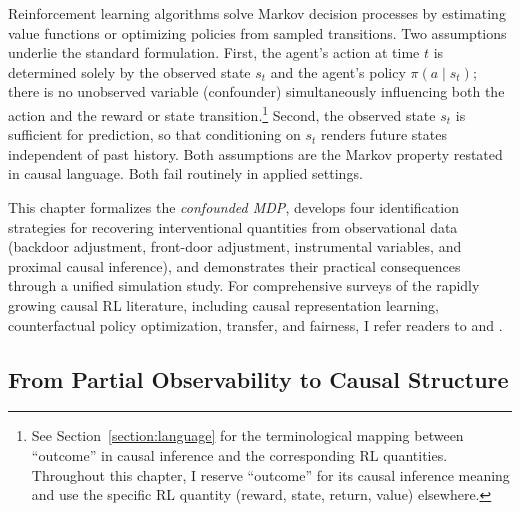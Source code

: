 %

Reinforcement learning algorithms solve Markov decision processes by estimating value functions or optimizing policies from sampled transitions. Two assumptions underlie the standard formulation. First, the agent's action at time $t$ is determined solely by the observed state $s_t$ and the agent's policy $\pi(a \mid s_t)$; there is no unobserved variable (confounder) simultaneously influencing both the action and the reward or state transition.\footnote{See Section~\ref{section:language} for the terminological mapping between ``outcome'' in causal inference and the corresponding RL quantities. Throughout this chapter, I reserve ``outcome'' for its causal inference meaning and use the specific RL quantity (reward, state, return, value) elsewhere.}
Second, the observed state $s_t$ is sufficient for prediction, so that conditioning on $s_t$ renders future states independent of past history. Both assumptions are the Markov property restated in causal language. Both fail routinely in applied settings.

This chapter formalizes the \textit{confounded MDP}, develops four identification strategies for recovering interventional quantities from observational data (backdoor adjustment, front-door adjustment, instrumental variables, and proximal causal inference), and demonstrates their practical consequences through a unified simulation study. For comprehensive surveys of the rapidly growing causal RL literature, including causal representation learning, counterfactual policy optimization, transfer, and fairness, I refer readers to \citet{deng2023causal} and \citet{dacostacunha2025unifying}.

\subsection{From Partial Observability to Causal Structure}
\label{subsec:pomdp_to_causal}

